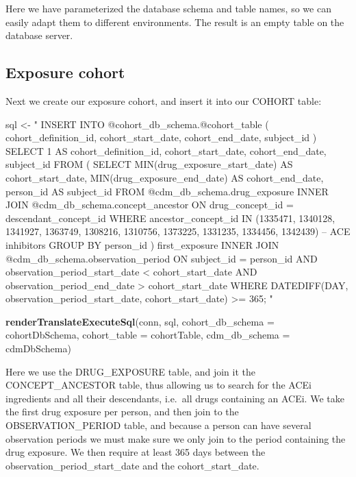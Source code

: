 \documentclass[11pt]{book}
\newenvironment{Shaded}{\begin{snugshade}}{\end{snugshade}}
\newcommand{\DataTypeTok}[1]{\textcolor[rgb]{0.13,0.29,0.53}{#1}}
\newcommand{\KeywordTok}[1]{\textcolor[rgb]{0.13,0.29,0.53}{\textbf{#1}}}
\newcommand{\NormalTok}[1]{#1}
\newcommand{\StringTok}[1]{\textcolor[rgb]{0.31,0.60,0.02}{#1}}
\theoremstyle{definition}
\theoremstyle{definition}
\theoremstyle{definition}
\theoremstyle{remark}
\begin{document}
Here we have parameterized the database schema and table names, so we can easily adapt them to different environments. The result is an empty table on the database server.

\hypertarget{exposure-cohort}{%
\subsection{Exposure cohort}\label{exposure-cohort}}

Next we create our exposure cohort, and insert it into our COHORT table:

\begin{Shaded}
\begin{Highlighting}[]
\NormalTok{sql <-}\StringTok{ "}
\StringTok{INSERT INTO @cohort_db_schema.@cohort_table (}
\StringTok{  cohort_definition_id,}
\StringTok{  cohort_start_date,}
\StringTok{  cohort_end_date,}
\StringTok{  subject_id}
\StringTok{)}
\StringTok{SELECT 1 AS cohort_definition_id,}
\StringTok{  cohort_start_date,}
\StringTok{  cohort_end_date,}
\StringTok{  subject_id}
\StringTok{FROM (}
\StringTok{  SELECT MIN(drug_exposure_start_date) AS cohort_start_date,}
\StringTok{    MIN(drug_exposure_end_date) AS cohort_end_date,}
\StringTok{    person_id AS subject_id}
\StringTok{  FROM @cdm_db_schema.drug_exposure}
\StringTok{  INNER JOIN @cdm_db_schema.concept_ancestor}
\StringTok{    ON drug_concept_id = descendant_concept_id}
\StringTok{  WHERE ancestor_concept_id IN (1335471, 1340128, 1341927,}
\StringTok{    1363749, 1308216, 1310756, 1373225, 1331235, 1334456,}
\StringTok{    1342439) -- ACE inhibitors}
\StringTok{  GROUP BY person_id}
\StringTok{) first_exposure}
\StringTok{INNER JOIN @cdm_db_schema.observation_period}
\StringTok{  ON subject_id = person_id}
\StringTok{    AND observation_period_start_date < cohort_start_date}
\StringTok{    AND observation_period_end_date > cohort_start_date}
\StringTok{WHERE DATEDIFF(DAY,}
\StringTok{               observation_period_start_date,}
\StringTok{               cohort_start_date) >= 365;}
\StringTok{"}

\KeywordTok{renderTranslateExecuteSql}\NormalTok{(conn, sql,}
                          \DataTypeTok{cohort_db_schema =}\NormalTok{ cohortDbSchema,}
                          \DataTypeTok{cohort_table =}\NormalTok{ cohortTable,}
                          \DataTypeTok{cdm_db_schema =}\NormalTok{ cdmDbSchema)}
\end{Highlighting}
\end{Shaded}

Here we use the DRUG\_EXPOSURE table, and join it the CONCEPT\_ANCESTOR table, thus allowing us to search for the ACEi ingredients and all their descendants, i.e.~all drugs containing an ACEi. We take the first drug exposure per person, and then join to the OBSERVATION\_PERIOD table, and because a person can have several observation periods we must make sure we only join to the period containing the drug exposure. We then require at least 365 days between the observation\_period\_start\_date and the cohort\_start\_date.
\end{document}
